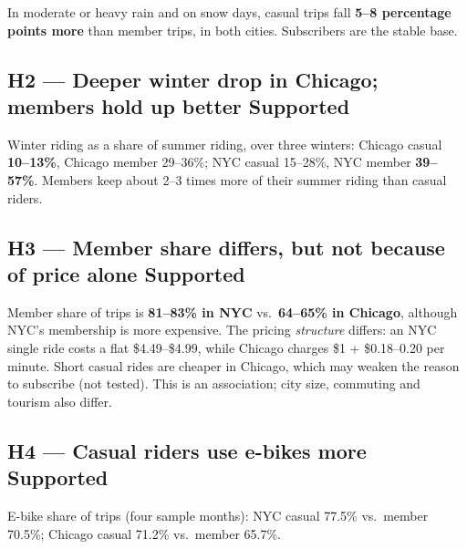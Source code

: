 \documentclass[11pt,a4paper]{article}
\begin{document}
In moderate or heavy rain and on snow days, casual trips fall \textbf{5--8 percentage points more} than member trips, in both cities. Subscribers are the stable base.

\subsection*{H2 --- Deeper winter drop in Chicago; members hold up better \hfill \textcolor{accent}{Supported}}
Winter riding as a share of summer riding, over three winters: Chicago casual \textbf{10--13\%}, Chicago member 29--36\%; NYC casual 15--28\%, NYC member \textbf{39--57\%}. Members keep about 2--3 times more of their summer riding than casual riders.

\subsection*{H3 --- Member share differs, but not because of price alone \hfill \textcolor{accent}{Supported}}
Member share of trips is \textbf{81--83\% in NYC} vs.\ \textbf{64--65\% in Chicago}, although NYC's membership is more expensive. The pricing \emph{structure} differs: an NYC single ride costs a flat \$4.49--\$4.99, while Chicago charges \$1 + \$0.18--0.20 per minute. Short casual rides are cheaper in Chicago, which may weaken the reason to subscribe (not tested). This is an association; city size, commuting and tourism also differ.

\subsection*{H4 --- Casual riders use e-bikes more \hfill \textcolor{accent}{Supported}}
E-bike share of trips (four sample months): NYC casual 77.5\% vs.\ member 70.5\%; Chicago casual 71.2\% vs.\ member 65.7\%.
\end{document}
